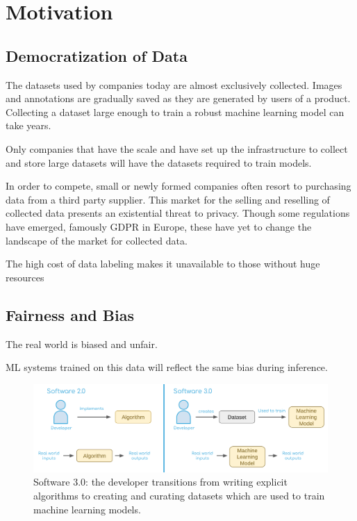 \documentclass{article}
\begin{document}
\section{Motivation}
\label{sec:motivation}

\subsection{Democratization of Data}

The datasets used by companies today are almost exclusively collected. Images and annotations are gradually saved as they are generated by users of a product. Collecting a dataset large enough to train a robust machine learning model can take years.

Only companies that have the scale and have set up the infrastructure to collect and store large datasets will have the datasets required to train models.

In order to compete, small or newly formed companies often resort to purchasing data from a third party supplier. This market for the selling and reselling of collected data presents an existential threat to privacy. Though some regulations have emerged, famously GDPR in Europe, these have yet to change the landscape of the market for collected data.

The high cost of data labeling makes it unavailable to those without huge resources

\subsection{Fairness and Bias}

The real world is biased and unfair.

ML systems trained on this data will reflect the same bias during inference.

\begin{figure}
	\centering
	\includegraphics[width=\textwidth]{software3.png}
	\caption{Software 3.0: the developer transitions from writing explicit algorithms to creating and curating datasets which are used to train machine learning models.}
	\label{fig:fig2}
\end{figure}
\end{document}
